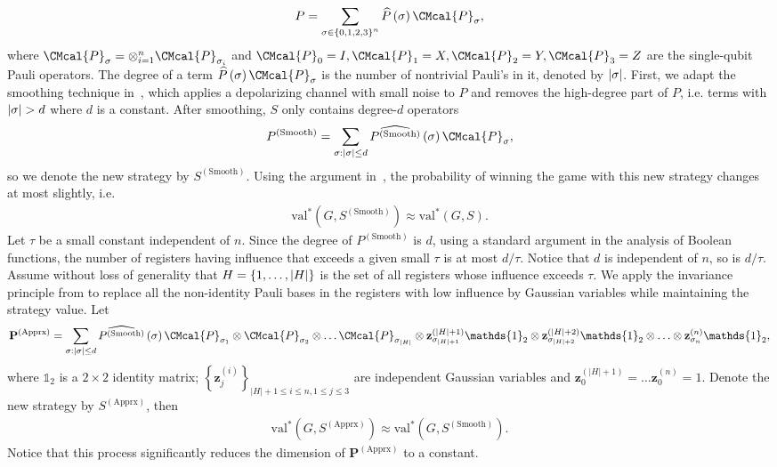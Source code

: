 \documentclass[11pt]{article}
\def\P{\CMcal{P}}
\theoremstyle{plain}
\theoremstyle{definition}
\newcommand {\set} [1] {\ensuremath{ \left\lbrace #1 \right\rbrace }}
\newcommand {\br} [1] {\ensuremath{ \left( #1 \right) }}
\DeclarePairedDelimiter{\abs}{\lvert}{\rvert}
\newcommand {\id} {\ensuremath{\mathds{1}}}
\newcommand{\randP}{\ensuremath{\mathbf{P}}}
\newcommand{\randz}{\ensuremath{\mathbf{z}}}
\newcommand{\1}{\mathbb{1}} %
\newcommand{\val}{\mathrm{val}}
\begin{document}
\[P=\sum_{\sigma\in\set{0,1,2,3}^n}\widehat{P}\br{\sigma}\P_{\sigma},\]
where $\P_{\sigma}=\otimes_{i=1}^n\P_{\sigma_i}$ and $\P_0=I,\P_1=X,\P_2=Y,\P_3=Z$ are the single-qubit Pauli operators.
The degree of a term $\widehat{P}\br{\sigma}\P_{\sigma}$ is the number of nontrivial Pauli's in it, denoted by $\abs{\sigma}$.
First, we adapt the smoothing technique in~\cite{qin2021nonlocal}, which applies a depolarizing channel with small noise to $P$ and removes the high-degree part of $P$, i.e. terms with $\abs{\sigma} > d$ where $d$ is a constant.  
After smoothing, $S$ only contains degree-$d$ operators 
\[P^{(\textrm{Smooth})}=\sum_{\sigma:\abs{\sigma}\leq d}\widehat{P^{(\textrm{Smooth})}}\br{\sigma}\P_{\sigma},\]
so we denote the new strategy by $S^{(\textrm{Smooth})}$.
Using the argument in~\cite{qin2021nonlocal}, the probability of winning the game with this new strategy changes at most slightly, i.e.
\begin{align*}
    \val^*(G, S^{(\textrm{Smooth})}) \approx \val^*(G, S).
\end{align*}
Let $\tau$ be a small constant independent of $n$. Since the degree of $P^{(\textrm{Smooth})}$ is $d$, using a standard argument in the analysis of Boolean functions, the number of registers having influence that exceeds a given small $\tau$ is at most $d/\tau$. Notice that $d$ is independent of $n$, so is $d/\tau$. 
Assume without loss of generality that $H=\set{1,\ldots, \abs{H}}$ is the set of all registers whose influence exceeds $\tau$. 
We apply the invariance principle from \cite{qin2021nonlocal} to replace all the non-identity Pauli bases in the registers with low influence by Gaussian variables while maintaining the strategy value.
Let
\[\randP^{(\textrm{Apprx})}=\sum_{\sigma:\abs{\sigma}\leq d}\widehat{P^{(\textrm{Smooth})}}\br{\sigma}\P_{\sigma_1}\otimes\P_{\sigma_2}\otimes\ldots\P_{\sigma_{|H|}}\otimes \randz^{(\abs{H}+1)}_{\sigma_{\abs{H}+1}}\id_2\otimes\randz^{(\abs{H}+2)}_{\sigma_{\abs{H}+2}}\id_2\otimes\ldots\otimes\randz^{(n)}_{\sigma_n}\id_2,\]
where $\id_2$ is a $2\times 2$ identity matrix; $\set{\randz^{(i)}_j}_{|H|+1\leq i\leq n, 1\leq j\leq 3}$ are independent Gaussian variables and $\randz^{(|H|+1)}_0=\ldots\randz^{(n)}_0=1$.
Denote the new strategy by $S^{(\textrm{Apprx})}$, then  
\begin{align*}
    \val^*(G, S^{(\textrm{Apprx})}) \approx \val^*(G, S^{(\textrm{Smooth})}).
\end{align*}
Notice that this process significantly reduces the dimension of $\randP^{(\textrm{Apprx})}$ to a constant.
\end{document}
